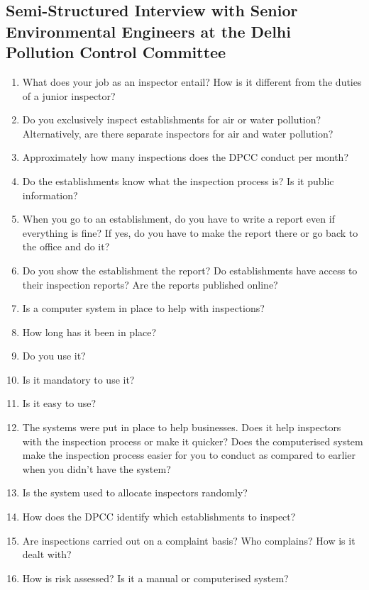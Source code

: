 \documentclass[a4paper, 12pt, twoside]{article}
\begin{document}
		\subsection*{Semi-Structured Interview with Senior Environmental Engineers at the Delhi Pollution Control Committee}
		
                    \begin{mdframed}[backgroundcolor=gray!20]
		\begin{enumerate}
		\item{What does your job as an inspector entail? How is it different from the duties of a junior inspector?}
		\item{Do you exclusively inspect establishments for air or water pollution? Alternatively, are there separate inspectors for air and water pollution?}
		\item{Approximately how many inspections does the DPCC conduct per month?}
		\item{Do the establishments know what the inspection process is? Is it public information?}
		\item{When you go to an establishment, do you have to write a report even if everything is fine? If yes, do you have to make the report there or go back to the office and do it?}
		\item{Do you show the establishment the report? Do establishments have access to their inspection reports? Are the reports published online?}
		\item{Is a computer system in place to help with inspections?}
		\item{How long has it been in place?}
		\item{Do you use it? }
		\item{Is it mandatory to use it?} 
		\item{Is it easy to use? }
		\item{The systems were put in place to help businesses. Does it help inspectors with the inspection process or make it quicker? Does the computerised system make the inspection process easier for you to conduct as compared to earlier when you didn’t have the system?}
		\item{Is the system used to allocate inspectors randomly?}
		\item{How does the DPCC identify which establishments to inspect?}
		\item{Are inspections carried out on a complaint basis? Who complains? How is it dealt with?}
		\item{How is risk assessed? Is it a manual or computerised system?}

\end{enumerate}
\end{mdframed}
\end{document}
